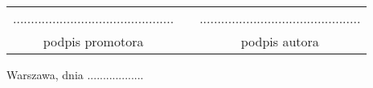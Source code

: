 \documentclass[a4paper,11pt,twoside,openright]{report}
\theoremstyle{definition}
\newcommand{\tytulstreszczenie}{Komputerowe wspomaganie detekcji obszaru kortów badmintona z~wykorzystaniem~sieci~neuronowych}
\renewcommand{\title}{Detecting badminton courts using computer vision powered \mbox{by neural networks}}
\begin{document}
\sloppy


% 




\thispagestyle{empty}\newpage
\null

\vfill

\begin{center}
\begin{tabular}[t]{ccc}

............................................. & \hspace*{100pt} & .............................................\\
podpis promotora & \hspace*{100pt} & podpis autora


\end{tabular}
\end{center}




{
\begin{abstract}

\begin{center}
\tytulstreszczenie
\end{center}

{streszczenie}

\end{abstract}
}

\null\thispagestyle{empty}\newpage

{
\begin{abstract}

\begin{center}
\title
\end{center}

{abstract}

\end{abstract}
}




\null\thispagestyle{empty}\newpage

\null \hfill Warszawa, dnia ..................\\

\par\vspace{5cm}
\end{document}
